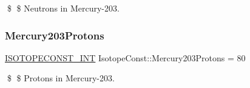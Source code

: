 \$ \$ Neutrons in Mercury-\/203. \mbox{\label{group___isotope_const-_mercury-_hg203_ga84f6c7c1ed03cdfc707d8a497b15703b}} 
\subsubsection{\texorpdfstring{Mercury203\+Protons}{Mercury203Protons}}
{\footnotesize\ttfamily \mbox{\hyperlink{group___isotope_const-_macros_ga5f18360b3e99483a35c32d789e62621c}{I\+S\+O\+T\+O\+P\+E\+C\+O\+N\+S\+T\+\_\+\+I\+NT}} Isotope\+Const\+::\+Mercury203\+Protons = 80}

\$ \$ Protons in Mercury-\/203. 